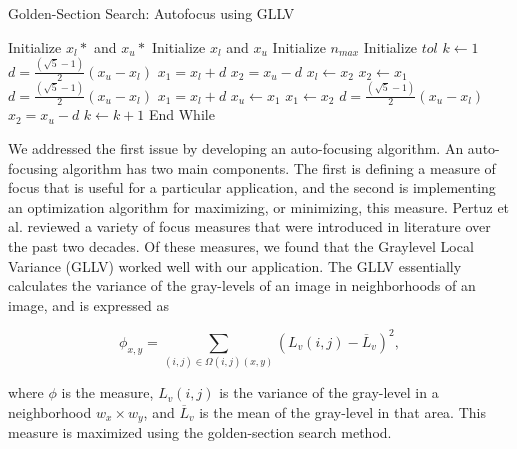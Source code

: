 \begin{algorithm}[H]
\caption{Golden-Section Search: Autofocus using GLLV}\label{euclid}
\begin{algorithmic}[1]
\State Initialize $x_{l}*$ and $x_{u}*$
\State Initialize $x_l$ and $x_u$
\State Initialize $n_{max}$
\State Initialize $tol$
\State $k \leftarrow 1$
        \State $d = \frac{(\sqrt{5}-1)}{2}(x_u-x_l)$
        \State $x_1 = x_l + d$
        \State $x_2 = x_u - d$
    \EndIf
            \State $x_l \leftarrow x_2$
            \State $x_2 \leftarrow x_1$
            \State $d = \frac{(\sqrt{5}-1)}{2}(x_u-x_l)$
            \State $x_1 = x_l + d$
        \Else 
            \State $x_u \leftarrow x_1$
            \State $x_1 \leftarrow x_2$
            \State $d = \frac{(\sqrt{5}-1)}{2}(x_u-x_l)$
            \State $x_2 = x_u - d$
        \EndIf
        \State $k \leftarrow k+1$
    \Else
        \State End While
    \EndIf
\EndWhile
\end{algorithmic}
\end{algorithm}

We addressed the first issue by developing an auto-focusing algorithm. An auto-focusing algorithm has two main components. The first is defining a measure of focus that is useful for a particular application, and the second is implementing an optimization algorithm for maximizing, or minimizing, this measure. Pertuz et al. reviewed a variety of focus measures that were introduced in literature over the past two decades\cite{Pertuz2013}. Of these measures, we found that the Graylevel Local Variance (GLLV) worked well with our application. The GLLV essentially calculates the variance of the gray-levels of an image in neighborhoods of an image, and is expressed as

\begin{equation}
    \phi_{x,y} = \sum_{(i,j) \in \Omega(i,j)(x,y)} (L_{v}(i,j) - \overline{L}_v)^2,
\end{equation}

where $\phi$ is the measure, $L_{v}(i,j)$ is the variance of the gray-level in a neighborhood $w_x \times w_y$, and $\overline{L}_v$ is the mean of the gray-level in that area. This measure is maximized using the golden-section search method.

